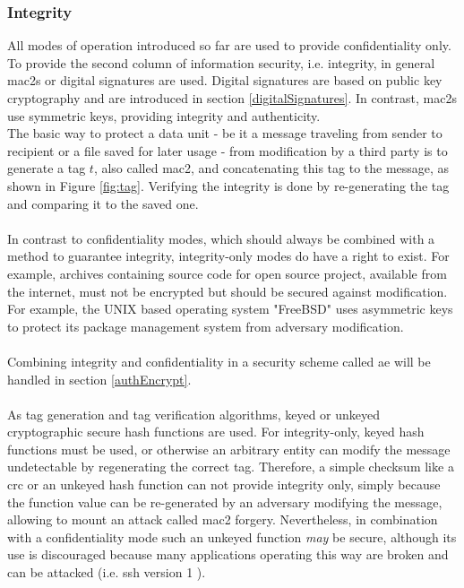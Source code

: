 \subsubsection{Integrity}\label{Integrity}
All modes of operation introduced so far are used to provide confidentiality only. To provide the second column of information security, i.e. integrity, in general
\glspl{mac2} or digital signatures are used.
Digital signatures are based on public key cryptography and are introduced in section \ref{digitalSignatures}. In contrast, \glspl{mac2} use symmetric keys,
providing integrity and authenticity. 
\\
The basic way to protect a data unit - be it a message traveling from sender to recipient or a file saved for later usage - from modification by a third party is to
generate a tag $t$, also called \gls{mac2}, and concatenating this tag to the message, as shown in Figure \ref{fig:tag}.
Verifying the integrity is done by re-generating the tag and comparing it to the saved one. 
\\
\\
In contrast to confidentiality modes, which should always be combined with a method to guarantee integrity, 
integrity-only modes do have a right to exist. For example, archives containing source code for open source project, available from the internet, must not be
encrypted but should be secured against modification. For example, the UNIX based operating system "FreeBSD" uses asymmetric keys to protect its package
management system from adversary modification.
\\
\\
Combining integrity and confidentiality in a security scheme called \gls{ae} will be handled in section \ref{authEncrypt}.
\\
\\
As tag generation and tag verification algorithms, keyed or unkeyed cryptographic secure hash functions are used.
For integrity-only, keyed hash functions must be used, or
otherwise an arbitrary entity can modify the message undetectable by regenerating the correct tag. Therefore, a simple checksum like a \gls{crc} or an unkeyed 
hash function can not provide integrity only, simply because the function value can be re-generated by an adversary modifying the message, allowing to mount
an attack called \gls{mac2} forgery.
Nevertheless, in combination with a confidentiality mode such an unkeyed function \textit{may} be secure, although its use is discouraged because many applications operating
this way are broken and can be attacked (i.e. \gls{ssh} version 1 \cite{zalewskissh}).
